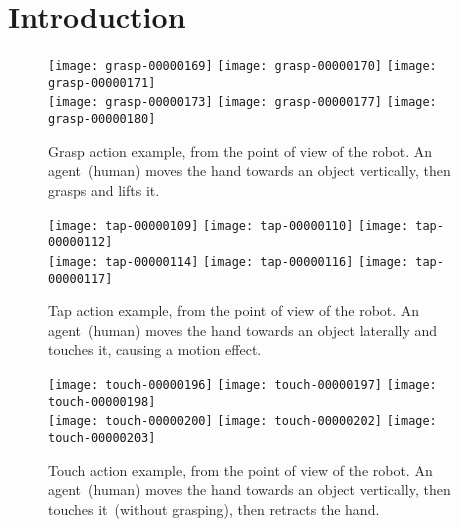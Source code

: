 
\section{Introduction}

\newcommand{\myWidth}{0.22}

\begin{figure*}
    \centering
    \subfloat
    { \texttt{[image: grasp-00000169]} } \quad
    \subfloat
    { \texttt{[image: grasp-00000170]} } \quad
    \subfloat
    { \texttt{[image: grasp-00000171]} } \\
    \subfloat
    { \texttt{[image: grasp-00000173]} } \quad
    \subfloat
    { \texttt{[image: grasp-00000177]} } \quad
    \subfloat
    { \texttt{[image: grasp-00000180]} }
    \caption{Grasp action example, from the point of view of the robot. An agent~(human) moves the hand towards an object vertically, then grasps and lifts it.}
\end{figure*}

\begin{figure*}
    \centering
    \subfloat
    { \texttt{[image: tap-00000109]} } \quad
    \subfloat
    { \texttt{[image: tap-00000110]} } \quad
    \subfloat
    { \texttt{[image: tap-00000112]} } \\
    \subfloat
    { \texttt{[image: tap-00000114]} } \quad
    \subfloat
    { \texttt{[image: tap-00000116]} } \quad
    \subfloat
    { \texttt{[image: tap-00000117]} }
    \caption{Tap action example, from the point of view of the robot. An agent~(human) moves the hand towards an object laterally and touches it, causing a motion effect.}
\end{figure*}

\begin{figure*}
    \centering
    \subfloat
    { \texttt{[image: touch-00000196]} } \quad
    \subfloat
    { \texttt{[image: touch-00000197]} } \quad
    \subfloat
    { \texttt{[image: touch-00000198]} } \\
    \subfloat
    { \texttt{[image: touch-00000200]} } \quad
    \subfloat
    { \texttt{[image: touch-00000202]} } \quad
    \subfloat
    { \texttt{[image: touch-00000203]} }
    \caption{Touch action example, from the point of view of the robot. An agent~(human) moves the hand towards an object vertically, then touches it~(without grasping), then retracts the hand.}
\end{figure*}

